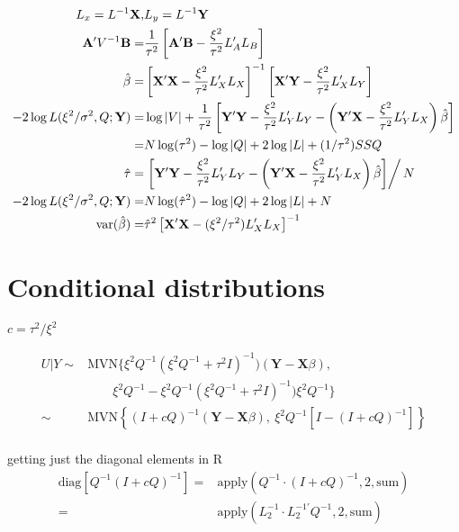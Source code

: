 \documentclass[12pt]{article}
\DeclareMathOperator{\var}{var}
\begin{document}
\begin{align*}
L_x = L^{-1} \mathbf{X}, & L_y = L^{-1}\mathbf{Y}\\
 \mathbf{A}' V^{-1} \mathbf{B}  = &  \frac{1}{\tau^2} \left[ \mathbf{A}' \mathbf{B} - \frac{\xi^2 }{\tau^2}  L_A' L_B \right] \\
 \hat\beta = & \left[ \mathbf{X}' \mathbf{X} - \frac{\xi^2 }{\tau^2}  L_X' L_X \right]^{-1} 
 \left[ \mathbf{X}' \mathbf{Y} - \frac{\xi^2 }{\tau^2}  L_X' L_Y \right]\\
-2 \log L (\xi^2/\sigma^2,Q;\mathbf{Y}) =& 
 \log| V| + \frac{1}{\tau^2}\left[ \mathbf{Y}' \mathbf{Y} - \frac{\xi^2 }{\tau^2}  L_Y' L_Y - 
\left( \mathbf{Y}' \mathbf{X} - \frac{\xi^2 }{\tau^2}  L_Y' L_X\right)
\hat\beta\right]  \\
= & N \log(\tau^2) - \log |Q| + 2 \log |L| + (1/\tau^2) SSQ \\
\hat\tau = & \left.\left[ \mathbf{Y}' \mathbf{Y} - \frac{\xi^2 }{\tau^2}  L_Y' L_Y - 
 \left(\mathbf{Y}' \mathbf{X}  - \frac{\xi^2 }{\tau^2}  L_Y' L_X\right)\hat\beta\right] \right/ N\\
-2 \log L (\xi^2/\sigma^2,Q;\mathbf{Y}) =& N \log(\hat\tau^2) - \log |Q| + 2 \log |L| + N\\
\var(\hat\beta) = & \hat\tau^2\left[\mathbf{X}' \mathbf{X} - (\xi^2 /\tau^2)  L_X' L_X \right]^{-1}
 \end{align*}
 


\section*{Conditional distributions}

$c = \tau^2/\xi^2$

\begin{align*}
U|Y \sim & \text{MVN}\{\xi^2Q^{-1}(\xi^2 Q^{-1} + \tau^2 I)^{-1})
(\mathbf{Y} - \mathbf{X}\beta), \\
&\qquad
\xi^2Q^{-1}- \xi^2Q^{-1}( \xi^2Q^{-1} + \tau^2 I  )^{-1})\xi^2 Q^{-1} \}\\
\sim &\text{MVN}\left\{  ( I + c Q  )^{-1}  (\mathbf{Y} -
\mathbf{X}\beta),\ \xi^2 Q^{-1}[I- ( I + cQ  )^{-1}	 ] \right\}\\
\end{align*}

getting just the diagonal elements in R
\begin{align*}
\text{diag}\left[Q^{-1} ( I + c Q  )^{-1}\right]	= &
\text{apply}(Q^{-1} \cdot
( I + c Q  )^{-1}, 2,\text{sum})\\
= & \text{apply}(L_2^{-1}\cdot L_2^{-1\prime}Q^{-1},2,\text{sum})
\end{align*}
\end{document}
